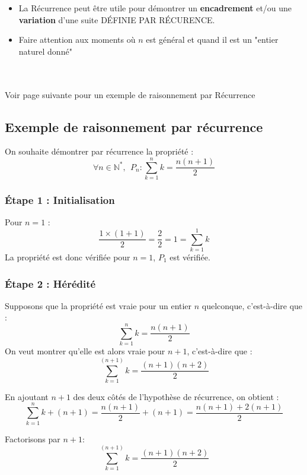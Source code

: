 \documentclass{report}
\begin{document}
    \begin{itemize}
      \item La Récurrence peut être utile pour démontrer un \textbf{encadrement} et/ou une \textbf{variation} d'une suite DÉFINIE PAR RÉCURENCE.
      \item Faire attention aux moments où $n$ est général et quand il est un "entier naturel donné"

      
    \end{itemize}

    ~ \\ ~ \\

    Voir page suivante pour un exemple de raisonnement par Récurrence

    \newpage


    \subsection{Exemple de raisonnement par récurrence}

    On souhaite démontrer par récurrence la propriété :
    \[
    \forall n \in \mathbb{N}^*, ~~P_n : \sum_{k=1}^{n} k = \frac{n(n+1)}{2}
    \]

    \subsubsection{Étape 1 : Initialisation}

    Pour \( n = 1 \) :
    \[
    \frac{1 \times (1+1)}{2} = \frac{2}{2} = 1 = \sum_{k=1}^{1} k
    \]
    La propriété est donc vérifiée pour \( n = 1 \), $P_1$ est vérifiée.

    \subsubsection{Étape 2 : Hérédité}

    Supposons que la propriété est vraie pour un entier \( n \) quelconque, c'est-à-dire que :
    \[
      \sum_{k=1}^{n} k = \frac{n(n+1)}{2}
    \]
    On veut montrer qu'elle est alors vraie pour \( n + 1 \), c'est-à-dire que :
    \[
      \sum_{k=1}^{(n+1)} k = \frac{(n+1)(n+2)}{2}
    \]

    En ajoutant \( n + 1 \) des deux côtés de l'hypothèse de récurrence, on obtient :
    \[
      \sum_{k=1}^{n} k + (n + 1) = \frac{n(n+1)}{2} + (n + 1) = \frac{n(n+1) + 2(n+1)}{2}
    \]

    Factorisons par \( n+1 \):
    \[
      \sum_{k=1}^{(n+1)} k = \frac{(n+1)(n+2)}{2}
    \]
\end{document}
